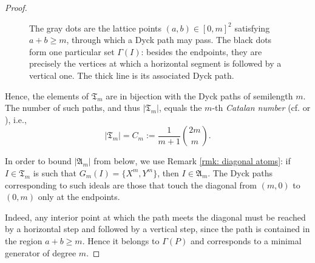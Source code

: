 \documentclass[a4paper,10pt,reqno]{amsart}
\theoremstyle{definition}
\theoremstyle{definition}
\begin{document}
\begin{proof}
\begin{figure}[ht]
\caption{The gray dots are the lattice points $(a,b)\in[0,m]^2$ satisfying
$a+b\ge m$, through which a Dyck path may pass. The black dots form one particular set $\Gamma(I)$: besides the endpoints, they are precisely
the vertices at which a horizontal segment is followed by a vertical
one. The thick line is its associated Dyck path.}
\end{figure}


Hence, the elements of $\mathfrak T_m$ are in bijection with the Dyck paths of semilength $m$. The number of such paths, and thus $\lvert \mathfrak T_m \rvert$, equals the $m$-th \emph{Catalan number} (cf. \cite[Theorem 1.5.1(vi)]{StaCat} or \cite[Exercise 6.19(i)]{Stanley}), i.e.,
    \[ \lvert \mathfrak T_m \rvert = C_m := \frac{1}{m+1}\binom{2m}{m}. \]

   In order to bound $\lvert \mathfrak A_m \rvert$ from below, we use Remark \ref{rmk: diagonal atoms}: if $I\in\mathfrak T_m$ is such that $G_m(I)=\{X^m,Y^m\}$, then $I\in\mathfrak A_m$. The Dyck paths corresponding to such ideals are those that touch the diagonal from $(m,0)$ to $(0,m)$ only at the endpoints. 

    Indeed, any interior point at which the path meets the diagonal must be reached by a horizontal step and followed by a vertical step, since the path is contained in the region $a+b\ge m$. Hence it belongs to $\Gamma(P)$ and corresponds to a minimal generator of degree $m$. 
   

\end{proof}
\end{document}
